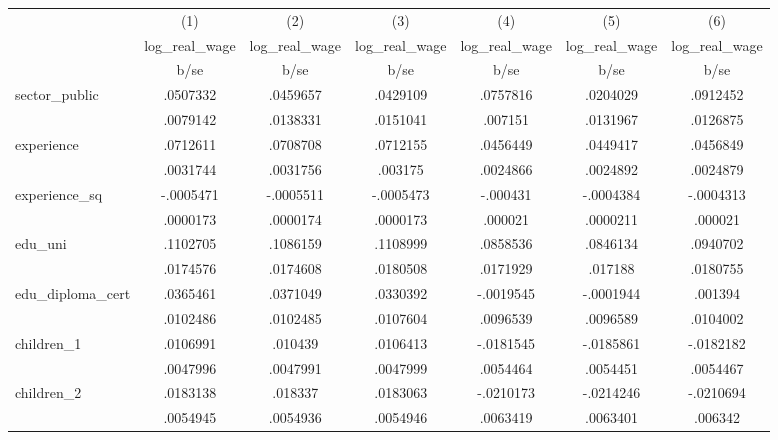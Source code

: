 {
\def\sym#1{\ifmmode^{#1}\else\(^{#1}\)\fi}
\begin{tabular}{l*{6}{c}}
\hline\hline
            &\multicolumn{1}{c}{(1)}&\multicolumn{1}{c}{(2)}&\multicolumn{1}{c}{(3)}&\multicolumn{1}{c}{(4)}&\multicolumn{1}{c}{(5)}&\multicolumn{1}{c}{(6)}\\
            &\multicolumn{1}{c}{log\_real\_wage}&\multicolumn{1}{c}{log\_real\_wage}&\multicolumn{1}{c}{log\_real\_wage}&\multicolumn{1}{c}{log\_real\_wage}&\multicolumn{1}{c}{log\_real\_wage}&\multicolumn{1}{c}{log\_real\_wage}\\
            &        b/se&        b/se&        b/se&        b/se&        b/se&        b/se\\
\hline
sector\_public&    .0507332&    .0459657&    .0429109&    .0757816&    .0204029&    .0912452\\
            &    .0079142&    .0138331&    .0151041&     .007151&    .0131967&    .0126875\\
experience  &    .0712611&    .0708708&    .0712155&    .0456449&    .0449417&    .0456849\\
            &    .0031744&    .0031756&     .003175&    .0024866&    .0024892&    .0024879\\
experience\_sq&   -.0005471&   -.0005511&   -.0005473&    -.000431&   -.0004384&   -.0004313\\
            &    .0000173&    .0000174&    .0000173&     .000021&    .0000211&     .000021\\
edu\_uni     &    .1102705&    .1086159&    .1108999&    .0858536&    .0846134&    .0940702\\
            &    .0174576&    .0174608&    .0180508&    .0171929&     .017188&    .0180755\\
edu\_diploma\_cert&    .0365461&    .0371049&    .0330392&   -.0019545&   -.0001944&     .001394\\
            &    .0102486&    .0102485&    .0107604&    .0096539&    .0096589&    .0104002\\
children\_1  &    .0106991&     .010439&    .0106413&   -.0181545&   -.0185861&   -.0182182\\
            &    .0047996&    .0047991&    .0047999&    .0054464&    .0054451&    .0054467\\
children\_2  &    .0183138&     .018337&    .0183063&   -.0210173&   -.0214246&   -.0210694\\
            &    .0054945&    .0054936&    .0054946&    .0063419&    .0063401&     .006342\\

\end{tabular}}

